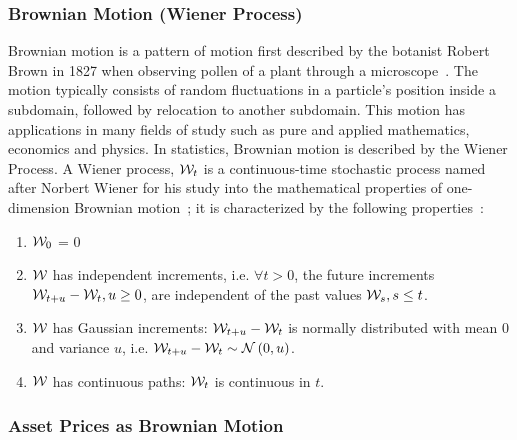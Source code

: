 \subsubsection{Brownian Motion (Wiener Process)}

Brownian motion is a pattern of motion first described by the botanist Robert Brown in 1827 when observing pollen of a plant through a microscope~\cite{pearle2010brown}. The motion typically consists of random fluctuations in a particle's position inside a subdomain, followed by relocation to another subdomain. This motion has applications in many fields of study such as pure and applied mathematics, economics and physics. In statistics, Brownian motion is described by the Wiener Process.
\nline{}
A Wiener process, \( \mathcal{W}_t \) is a continuous-time stochastic process named after Norbert Wiener for his study into the mathematical properties of one-dimension Brownian motion~\cite{wiener1976norbert}; it is characterized by the following properties~\cite{durrett2019probability}:

\begin{enumerate}
    \item \( \mathcal{W}_0 \) = 0
    \item \( \mathcal{W} \) has independent increments, i.e. \( \forall t>0 \), the future increments \( \mathcal{W}_{t+u} - \mathcal{W}_t, u \geq 0 \), are independent of the past values \( \mathcal{W}_s, s \leq t \).
    \item\label{Weiner process Gaussian increments} \( \mathcal{W} \) has Gaussian increments: \( \mathcal{W}_{t+u} - \mathcal{W}_t \) is normally distributed with mean 0 and variance \( u \), i.e. \hfill\break{} \( \mathcal{W}_{t+u} - \mathcal{W}_t \sim \mathcal{N}\left(0, u\right)\).
    \item \( \mathcal{W} \) has continuous paths: \( \mathcal{W}_t \) is continuous in \( t \).
\end{enumerate}

\subsubsection{Asset Prices as Brownian Motion}

